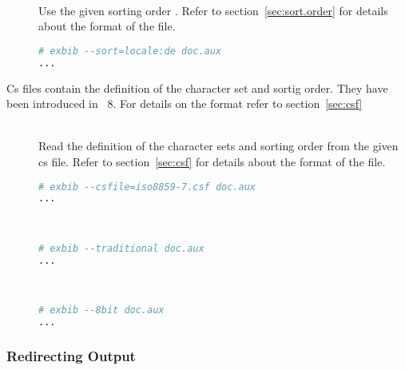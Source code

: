 \begin{description}
\item[ ]
\item[ ]\ \\
  Use the given sorting order . Refer to section~\ref{sec:sort.order} for
  details about the format of the file.

\begin{lstlisting}[language=sh]
# exbib --sort=locale:de doc.aux
...
\end{lstlisting}

\end{description}


Cs files contain the definition of the character set and sortig
order. They have been introduced in \BibTeX~8.
For details on the format refer to section~\ref{sec:csf}

\begin{description}
\item[ ]\ \\
  Read the definition of the character sets and sorting order from the
  given cs file. Refer to section~\ref{sec:csf} for details about the
  format of the file.
\begin{lstlisting}[language=sh]
# exbib --csfile=iso8859-7.csf doc.aux
...
\end{lstlisting}

\item[]
\item[]\ \\
  \INCOMPLETE
\begin{lstlisting}[language=sh]
# exbib --traditional doc.aux
...
\end{lstlisting}

\item[]
\item[]\ \\
  \INCOMPLETE
\begin{lstlisting}[language=sh]
# exbib --8bit doc.aux
...
\end{lstlisting}
\end{description}

\subsubsection{Redirecting Output}

